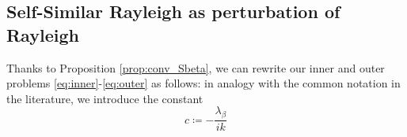 \documentclass[11pt,reqno]{amsproc}
\def\dd{{\rm d}}
\def\de{{\partial}}
\def\Re{{\rm Re}}
\newcommand{\norm}[1]{\left\lVert #1 \right\rVert}
\newcommand{\rmL}{\mathrm{L}}
\newcommand\smallO{
  \mathchoice
    {{\scriptstyle\mathcal{O}}}%
    {{\scriptstyle\mathcal{O}}}%
    {{\scriptscriptstyle\mathcal{O}}}%
    {\scalebox{.7}{$\scriptscriptstyle\mathcal{O}$}}%
  }
\newtheorem{proposition}{Proposition}[section]
\theoremstyle{definition}
\theoremstyle{definition}
\numberwithin{equation}{section}
\begin{document}
\subsection{Self-Similar Rayleigh as perturbation of Rayleigh}
Thanks to Proposition \ref{prop:conv_Sbeta}, we can rewrite our inner and outer problems \cref{eq:inner}-\cref{eq:outer} as follows:  in analogy with the common notation in the literature, we introduce the constant
\begin{equation}
\label{def:c}
c\coloneqq-\frac{\lambda_\beta}{ik}    
\end{equation}
\end{document}
